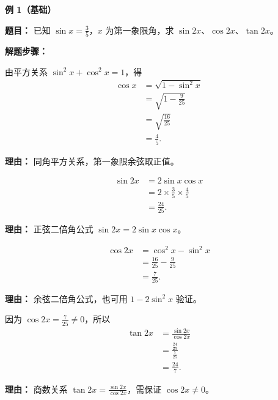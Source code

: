 \begin{examplebox}

	\textbf{\textcolor{CExample}{例 1（基础）}}

	\textbf{\textcolor{CExample}{题目：}} 已知 $\sin x = \frac{3}{5}$，$x$ 为第一象限角，求 $\sin 2x$、$\cos 2x$、$\tan 2x$。

	\textbf{\textcolor{CExample}{解题步骤：}}
	\begin{description}[style=nextline, leftmargin=2.8em, labelsep=0.5em, itemsep=0.45em]
		\item[\textbf{第一步（求单角余弦）：}] 由平方关系 $\sin^2 x + \cos^2 x = 1$，得
		      \[
			      \begin{aligned}
				      \cos x & = \sqrt{1-\sin^2 x}     \\
				             & = \sqrt{1-\frac{9}{25}} \\
				             & = \sqrt{\frac{16}{25}}  \\
				             & = \frac{4}{5}.
			      \end{aligned}
		      \]
		      \par\textbf{理由：} 同角平方关系，第一象限余弦取正值。

		\item[\textbf{第二步（正弦二倍角）：}]
		      \[
			      \begin{aligned}
				      \sin 2x & = 2\sin x \cos x                          \\
				              & = 2 \times \frac{3}{5} \times \frac{4}{5} \\
				              & = \frac{24}{25}.
			      \end{aligned}
		      \]
		      \par\textbf{理由：} 正弦二倍角公式 $\sin 2x = 2\sin x\cos x$。

		\item[\textbf{第三步（余弦二倍角）：}]
		      \[
			      \begin{aligned}
				      \cos 2x & = \cos^2 x - \sin^2 x          \\
				              & = \frac{16}{25} - \frac{9}{25} \\
				              & = \frac{7}{25}.
			      \end{aligned}
		      \]
		      \par\textbf{理由：} 余弦二倍角公式，也可用 $1-2\sin^2 x$ 验证。

		\item[\textbf{第四步（求正切值）：}]
		      因为 $\cos 2x=\frac{7}{25}\ne0$，所以
		      \[
			      \begin{aligned}
				      \tan 2x & = \frac{\sin 2x}{\cos 2x}            \\
				              & = \frac{\frac{24}{25}}{\frac{7}{25}} \\
				              & = \frac{24}{7}.
			      \end{aligned}
		      \]
		      \par\textbf{理由：} 商数关系 $\tan 2x=\frac{\sin 2x}{\cos 2x}$，需保证 $\cos 2x\ne0$。
	\end{description}


\end{examplebox}
